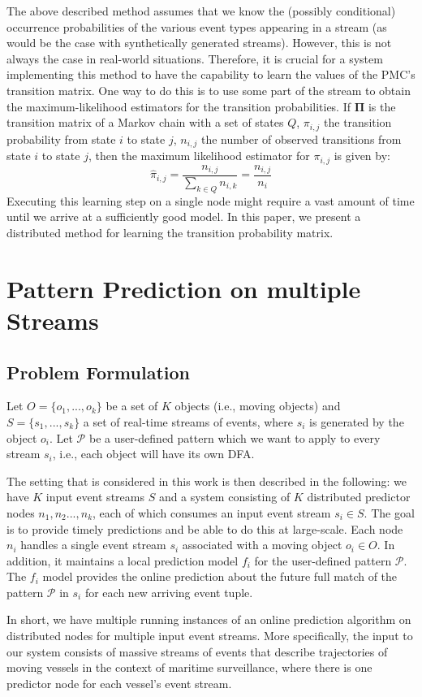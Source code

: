 The above described method assumes that we know the (possibly conditional) occurrence probabilities of the various event types appearing in a stream
(as would be the case with synthetically generated streams).
However, this is not always the case in real-world situations.
Therefore, it is crucial for a system implementing this method to have the capability to learn the values of the PMC's transition matrix.
One way to do this is to use some part of the stream to obtain the maximum-likelihood estimators for the transition probabilities. 
If $\boldsymbol{\Pi}$ is the transition matrix of a Markov chain with a set of states $Q$, 
$\pi_{i,j}$ the transition probability from state $i$ to state $j$,
$n_{i,j}$ the number of observed transitions from state $i$ to state $j$,
then the maximum likelihood estimator for $\pi_{i,j}$ is given by:
\begin{equation*}
\label{eq:pi_estim}
\hat{\pi}_{i,j}=\frac{n_{i,j}}{\sum_{k \in Q} n_{i,k}}=\frac{n_{i,j}}{n_{i}}
\end{equation*}
Executing this learning step on a single node might require a vast amount of time until we arrive at a sufficiently good model.
In this paper, we present a distributed method for learning the transition probability matrix.

\section{Pattern Prediction on multiple Streams}

\subsection{Problem Formulation}
Let $O = \{ o_1, ..., o_k\}$ be a set of \emph{$K$}  objects (i.e., moving objects) 
and $S = \{ s_1, ..., s_k\}$ a set of real-time streams of events,
where $s_i$ is generated by the object $o_i$.
Let $\mathcal{P}$ be a user-defined pattern which we want to apply to every stream $s_i$,
i.e., each object will have its own DFA.

\par The setting that is considered in this work is then described in the following:
we have \emph{$K$} input event streams $S$ and a system consisting of \emph{$K$} distributed predictor nodes $n_1,n_2...,n_k$, each of which consumes an input event stream $s_i\in S$. The goal is to provide timely predictions and be able to do this at large-scale.
Each node $n_i$ handles a single event stream $s_i$ associated with a moving object $o_i \in O$. In addition,  it  maintains a local prediction model $f_i$ for the user-defined pattern $\mathcal{P}$. The $f_i$ model provides the online prediction about the future full match of the pattern $\mathcal{P}$ in $s_i$  for each new arriving event tuple. 
\par In short, we have multiple running instances of an online prediction algorithm on distributed nodes for multiple input event streams. More specifically, the input to our system consists of massive streams of events  that describe trajectories of moving vessels in the context of maritime surveillance, where there is one predictor node for each vessel's event stream.
  
